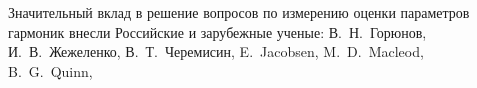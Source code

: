 Значительный вклад в решение вопросов по измерению оценки параметров гармоник внесли Российские и зарубежные ученые: 
В.~Н.~Горюнов, 
И.~В.~Жежеленко,
В.~Т.~Черемисин,
E.~Jacobsen, 
M.~D.~Macleod,
B.~G.~Quinn,
